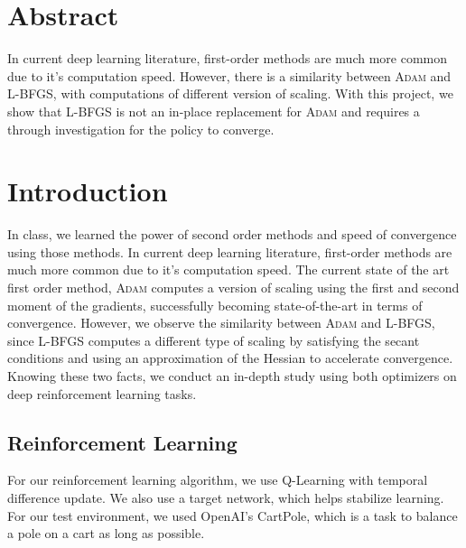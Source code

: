 \documentclass[11pt]{article}
\title{\projecttitle{}}
\begin{document}
\thispagestyle{empty}
\maketitle

\section{Abstract}
In current deep learning literature, first-order methods are much more common due to it's computation speed.
However, there is a similarity between \textsc{Adam} and \textsc{L-BFGS}, with computations of different version of scaling.
With this project, we show that \textsc{L-BFGS} is not an in-place replacement for \textsc{Adam} and requires a through investigation for the policy to converge.

\section{Introduction}
In class, we learned the power of second order methods and speed of convergence using those methods.
In current deep learning literature, first-order methods are much more common due to it's computation speed.
The current state of the art first order method, \textsc{Adam} computes a version of scaling using the first and second moment of the gradients, successfully becoming state-of-the-art in terms of convergence.
However, we observe the similarity between \textsc{Adam} and \textsc{L-BFGS}, since \textsc{L-BFGS} computes a different type of scaling by satisfying the secant conditions and using an approximation of the Hessian to accelerate convergence.
Knowing these two facts, we conduct an in-depth study using both optimizers on deep reinforcement learning tasks.
\subsection{Reinforcement Learning}
For our reinforcement learning algorithm, we use Q-Learning with temporal difference update.
We also use a target network, which helps stabilize learning.
For our test environment, we used OpenAI's CartPole, which is a task to balance a pole on a cart as long as possible.

\end{document}
